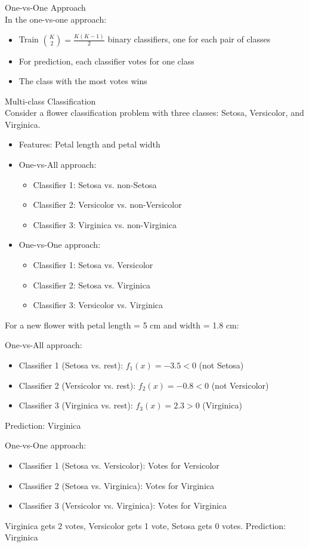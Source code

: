 \begin{definition}{One-vs-One Approach}\\
In the one-vs-one approach:
\begin{itemize}
    \item Train $\binom{K}{2} = \frac{K(K-1)}{2}$ binary classifiers, one for each pair of classes
    \item For prediction, each classifier votes for one class
    \item The class with the most votes wins
\end{itemize}
\end{definition}

\begin{example2}{Multi-class Classification}\\
Consider a flower classification problem with three classes: Setosa, Versicolor, and Virginica.
\begin{itemize}
    \item Features: Petal length and petal width
    \item One-vs-All approach:
    \begin{itemize}
        \item Classifier 1: Setosa vs. non-Setosa
        \item Classifier 2: Versicolor vs. non-Versicolor
        \item Classifier 3: Virginica vs. non-Virginica
    \end{itemize}
    \item One-vs-One approach:
    \begin{itemize}
        \item Classifier 1: Setosa vs. Versicolor
        \item Classifier 2: Setosa vs. Virginica
        \item Classifier 3: Versicolor vs. Virginica
    \end{itemize}
\end{itemize}
\tcblower
For a new flower with petal length = 5 cm and width = 1.8 cm:

One-vs-All approach:
\begin{itemize}
    \item Classifier 1 (Setosa vs. rest): $f_1(x) = -3.5 < 0$ (not Setosa)
    \item Classifier 2 (Versicolor vs. rest): $f_2(x) = -0.8 < 0$ (not Versicolor)
    \item Classifier 3 (Virginica vs. rest): $f_3(x) = 2.3 > 0$ (Virginica)
\end{itemize}
Prediction: Virginica

One-vs-One approach:
\begin{itemize}
    \item Classifier 1 (Setosa vs. Versicolor): Votes for Versicolor
    \item Classifier 2 (Setosa vs. Virginica): Votes for Virginica
    \item Classifier 3 (Versicolor vs. Virginica): Votes for Virginica
\end{itemize}
Virginica gets 2 votes, Versicolor gets 1 vote, Setosa gets 0 votes.
Prediction: Virginica
\end{example2}

